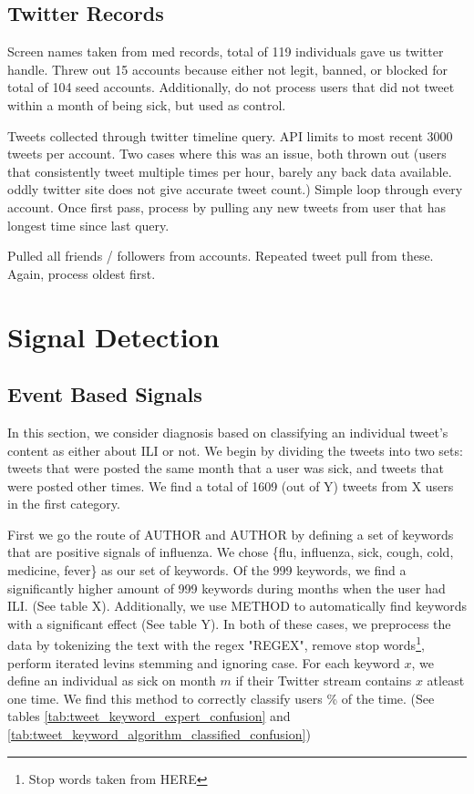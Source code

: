 \documentclass{acm_proc_article-sp}
\begin{document}
\subsection{Twitter Records}
Screen names taken from med records, total of 119 individuals gave us twitter handle. Threw out 15 accounts because either not legit, banned, or blocked for total of 104 seed accounts. Additionally, do not process users that did not tweet within a month of being sick, but used as control.

Tweets collected through twitter timeline query. API limits to most recent 3000 tweets per account. Two cases where this was an issue, both thrown out (users that consistently tweet multiple times per hour, barely any back data available. oddly twitter site does not give accurate tweet count.) Simple loop through every account. Once first pass, process by pulling any new tweets from user that has longest time since last query. 

Pulled all friends / followers from accounts. Repeated tweet pull from these. Again, process oldest first.

\section{Signal Detection}
\subsection{Event Based Signals}

In this section, we consider diagnosis based on classifying an individual tweet's content as either about ILI or not. We begin by dividing the tweets into two sets: tweets that were posted the same month that a user was sick, and tweets that were posted other times. We find a total of 1609 (out of Y) tweets from X users in the first category.

First we go the route of AUTHOR and AUTHOR by defining a set of keywords that are positive signals of influenza. We chose \{flu, influenza, sick, cough, cold, medicine, fever\} as our set of keywords. Of the 999 keywords, we find a significantly higher amount of 999 keywords during months when the user had ILI. (See table X). Additionally, we use METHOD to automatically find keywords with a significant effect (See table Y). In both of these cases, we preprocess the data by tokenizing the text with the regex "REGEX", remove stop words\footnote{Stop words taken from HERE}, perform iterated levins stemming and ignoring case. For each keyword \(x\), we define an individual as sick on month \(m\) if their Twitter stream contains \(x\) atleast one time. We find this method to correctly classify users \% of the time. (See tables \ref{tab:tweet_keyword_expert_confusion} and \ref{tab:tweet_keyword_algorithm_classified_confusion})
\end{document}
